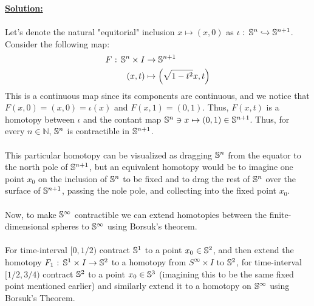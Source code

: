 \documentclass[11pt]{article}
\begin{document}
\vskip 0.5cm
\textbf{\underline{Solution:}}
\\
\\
Let's denote the natural "equitorial" inclusion $x \mapsto (x, 0)$ as $\iota \text{ : } \mathbb{S}^n \xhookrightarrow{} \mathbb{S}^{n+1}$. Consider the following map: 
\begin{align*}
  F \text{ : } \mathbb{S}^n \times I &\rightarrow \mathbb{S}^{n+1} \\
  (x, t) &\mapsto \left( \sqrt{1-t^2}x, t \right)
\end{align*} This is a continuous map since its components are continuous, and we notice that $F(x, 0) = (x, 0) = \iota(x)$ and $F(x, 1) = (0, 1)$. Thus, $F(x, t)$ is a homotopy between $\iota$ and the contant map $ \mathbb{S}^n \ni x \mapsto (0, 1) \in \mathbb{S}^{n+1}$. Thus, for every $n \in \mathbb{N}$, $\mathbb{S}^n$ is contractible in $\mathbb{S}^{n+1}$.
\\
\\
This particular homotopy can be visualized as dragging $\mathbb{S}^{n}$ from the equator to the north pole of $\mathbb{S}^{n+1}$, but an equivalent homotopy would be to imagine one point $x_0$ on the inclusion of $\mathbb{S}^n$ to be fixed and to drag the rest of $\mathbb{S}^n$ over the surface of $\mathbb{S}^{n+1}$, passing the nole pole, and collecting into the fixed point $x_0$.
\\
\\
Now, to make $\mathbb{S}^{\infty}$ contractible we can extend homotopies between the finite-dimensional spheres to $\mathbb{S}^{\infty}$ using Borsuk's theorem.
\\
\\
For time-interval $[0, 1/2)$ contract $\mathbb{S}^{1}$ to a point $x_0 \in \mathbb{S}^2$, and then extend the homotopy $F_1 \text{ : } \mathbb{S}^1 \times I \rightarrow \mathbb{S}^2$ to a homotopy from $S^{\infty} \times I$ to $\mathbb{S}^2$, for time-interval $[1/2, 3/4)$ contract $\mathbb{S}^2$ to a point $x_0 \in \mathbb{S}^3$ (imagining this to be the same fixed point mentioned earlier) and similarly extend it to a homotopy on $\mathbb{S}^{\infty}$ using Borsuk's Theorem.
\\
\end{document}
